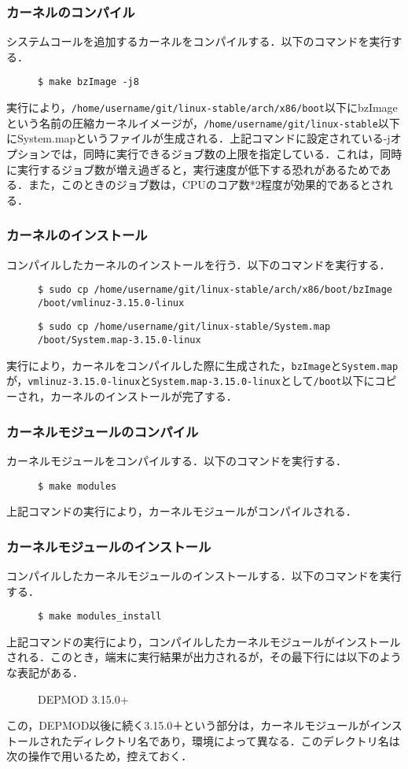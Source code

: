 \documentclass[12pt]{jsarticle}
\begin{document}
\subsubsection{カーネルのコンパイル}
システムコールを追加するカーネルをコンパイルする．以下のコマンドを実行する．
\begin{description}
\item[] \verb|$ make bzImage -j8|
\end{description}
実行により，\verb|/home/username/git/linux-stable/arch/x86/boot|以下にbzImageという名前の圧縮カーネルイメージが，\verb|/home/username/git/linux-stable|以下にSystem.mapというファイルが生成される．上記コマンドに設定されている-jオプションでは，同時に実行できるジョブ数の上限を指定している．これは，同時に実行するジョブ数が増え過ぎると，実行速度が低下する恐れがあるためである．また，このときのジョブ数は，CPUのコア数*2程度が効果的であるとされる\cite{jobs}．
\subsubsection{カーネルのインストール}\label{kerin}
コンパイルしたカーネルのインストールを行う．以下のコマンドを実行する．
\begin{description}
\item[] \verb|$ sudo cp /home/username/git/linux-stable/arch/x86/boot/bzImage /boot/vmlinuz-3.15.0-linux|
\item[] \verb|$ sudo cp /home/username/git/linux-stable/System.map /boot/System.map-3.15.0-linux|
\end{description}
実行により，カーネルをコンパイルした際に生成された，\verb|bzImage|と\verb|System.map|が，\verb|vmlinuz-3.15.0-linux|と\verb|System.map-3.15.0-linux|として\verb|/boot|以下にコピーされ，カーネルのインストールが完了する．
\subsubsection{カーネルモジュールのコンパイル}
カーネルモジュールをコンパイルする．以下のコマンドを実行する．
\begin{description}
\item[] \verb|$ make modules|
\end{description}
上記コマンドの実行により，カーネルモジュールがコンパイルされる．
\subsubsection{カーネルモジュールのインストール}\label{kermin}
コンパイルしたカーネルモジュールのインストールする．以下のコマンドを実行する．
\begin{description}
\item[] \verb|$ make modules_install|
\end{description}
上記コマンドの実行により，コンパイルしたカーネルモジュールがインストールされる．このとき，端末に実行結果が出力されるが，その最下行には以下のような表記がある．
\begin{description}
\item[] DEPMOD 3.15.0+
\end{description}
この，DEPMOD以後に続く3.15.0＋という部分は，カーネルモジュールがインストールされたディレクトリ名であり，環境によって異なる．このデレクトリ名は次の操作で用いるため，控えておく．
\end{document}
